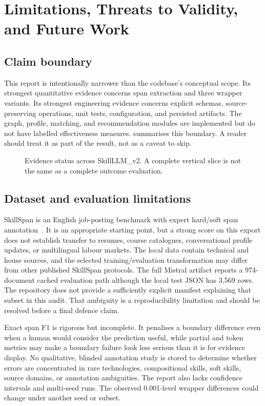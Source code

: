 \chapter{Limitations, Threats to Validity, and Future Work}
\label{ch:limitations}

\section{Claim boundary}

This report is intentionally narrower than the codebase's conceptual scope. Its strongest quantitative evidence concerns span extraction and three wrapper variants. Its strongest engineering evidence concerns explicit schemas, source-preserving operations, unit tests, configuration, and persisted artifacts. The graph, profile, matching, and recommendation modules are implemented but do not have labelled effectiveness measures.  summarises this boundary. A reader should treat it as part of the result, not as a caveat to skip.

\begin{figure}[H]
\centering

\caption{Evidence status across SkillLLM\_v2. A complete vertical slice is not the same as a complete outcome evaluation.}
\label{fig:status}
\end{figure}

\section{Dataset and evaluation limitations}

SkillSpan is an English job-posting benchmark with expert hard/soft span annotation~\cite{zhang2022skillspan}. It is an appropriate starting point, but a strong score on this export does not establish transfer to resumes, course catalogues, conversational profile updates, or multilingual labour markets. The local data contain technical and house sources, and the selected training/evaluation transformation may differ from other published SkillSpan protocols. The full Mistral artifact reports a 974-document cached evaluation path although the local test JSON has 3,569 rows. The repository does not provide a sufficiently explicit manifest explaining that subset in this audit. That ambiguity is a reproducibility limitation and should be resolved before a final defence claim.

Exact span F1 is rigorous but incomplete. It penalises a boundary difference even when a human would consider the prediction useful, while partial and token metrics may make a boundary failure look less serious than it is for evidence display. No qualitative, blinded annotation study is stored to determine whether errors are concentrated in rare technologies, compositional skills, soft skills, source domains, or annotation ambiguities. The report also lacks confidence intervals and multi-seed runs. The observed 0.001-level wrapper differences could change under another seed or subset.

